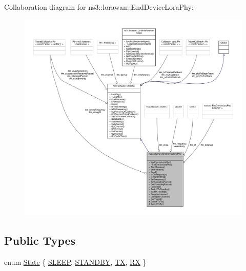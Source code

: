 Collaboration diagram for ns3\+:\+:lorawan\+:\+:End\+Device\+Lora\+Phy\+:
\nopagebreak
\begin{figure}[H]
\begin{center}
\leavevmode
\includegraphics[width=350pt]{classns3_1_1lorawan_1_1EndDeviceLoraPhy__coll__graph}
\end{center}
\end{figure}
\subsection*{Public Types}
\begin{DoxyCompactItemize}
\item 
enum \hyperlink{classns3_1_1lorawan_1_1EndDeviceLoraPhy_adc84e4ce7796e19f19f077df9592af15}{State} \{ \hyperlink{classns3_1_1lorawan_1_1EndDeviceLoraPhy_adc84e4ce7796e19f19f077df9592af15a91cae5560efbfdfd6fa3e67de3a36aba}{S\+L\+E\+EP}, 
\hyperlink{classns3_1_1lorawan_1_1EndDeviceLoraPhy_adc84e4ce7796e19f19f077df9592af15ab546b76625ba0fd4ef3ea6cba6094786}{S\+T\+A\+N\+D\+BY}, 
\hyperlink{classns3_1_1lorawan_1_1EndDeviceLoraPhy_adc84e4ce7796e19f19f077df9592af15a35909838f2f9bf50690fefcd45628415}{TX}, 
\hyperlink{classns3_1_1lorawan_1_1EndDeviceLoraPhy_adc84e4ce7796e19f19f077df9592af15a25a7f183ed9b12f183b7fc6eb553cb5c}{RX}
 \}
\end{DoxyCompactItemize}
